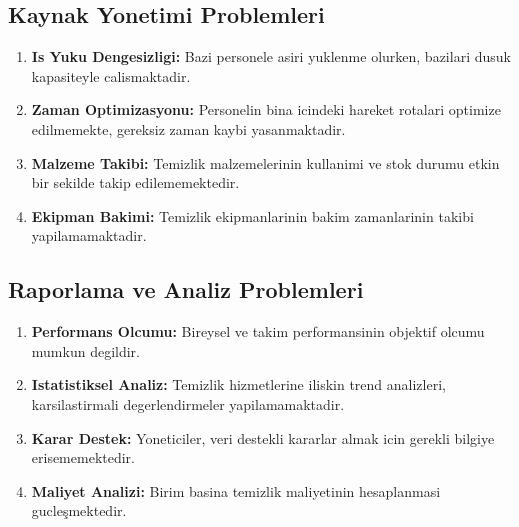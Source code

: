 \subsection{Kaynak Yonetimi Problemleri}
\label{subsec:kaynak-problemleri}

\begin{enumerate}
    \item \textbf{Is Yuku Dengesizligi:} Bazi personele asiri yuklenme 
    olurken, bazilari dusuk kapasiteyle calismaktadir.
    
    \item \textbf{Zaman Optimizasyonu:} Personelin bina icindeki 
    hareket rotalari optimize edilmemekte, gereksiz zaman kaybi 
    yasanmaktadir.
    
    \item \textbf{Malzeme Takibi:} Temizlik malzemelerinin kullanimi 
    ve stok durumu etkin bir sekilde takip edilememektedir.
    
    \item \textbf{Ekipman Bakimi:} Temizlik ekipmanlarinin bakim 
    zamanlarinin takibi yapilamamaktadir.
\end{enumerate}

\subsection{Raporlama ve Analiz Problemleri}
\label{subsec:raporlama-problemleri}

\begin{enumerate}
    \item \textbf{Performans Olcumu:} Bireysel ve takim performansinin 
    objektif olcumu mumkun degildir.
    
    \item \textbf{Istatistiksel Analiz:} Temizlik hizmetlerine iliskin 
    trend analizleri, karsilastirmali degerlendirmeler 
    yapilamamaktadir.
    
    \item \textbf{Karar Destek:} Yoneticiler, veri destekli kararlar 
    almak icin gerekli bilgiye erisememektedir.
    
    \item \textbf{Maliyet Analizi:} Birim basina temizlik maliyetinin 
    hesaplanmasi gucleşmektedir.
\end{enumerate}

